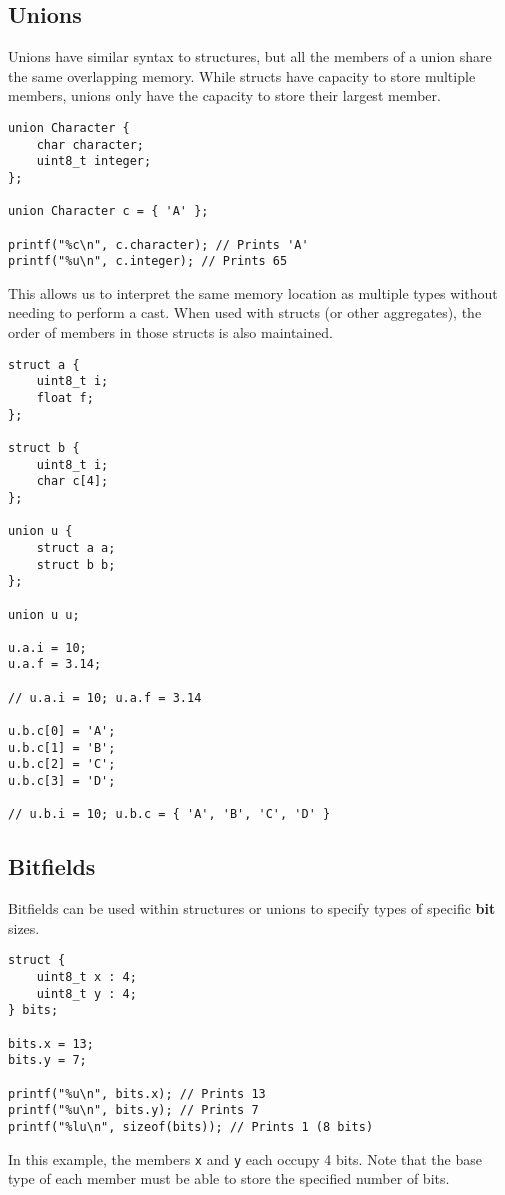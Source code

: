 \documentclass{article}
\begin{document}
\subsection{Unions}
Unions have similar syntax to structures, but all the members of a
union share the same overlapping memory. While structs have capacity to
store multiple members, unions only have the capacity to store their
largest member.
\begin{verbatim}
union Character {
    char character;
    uint8_t integer;
};

union Character c = { 'A' };

printf("%c\n", c.character); // Prints 'A'
printf("%u\n", c.integer); // Prints 65
\end{verbatim}
This allows us to interpret the same memory location as multiple types
without needing to perform a cast. When used with structs (or other
aggregates), the order of members in those structs is also maintained.
\begin{verbatim}
struct a {
    uint8_t i;
    float f;
};

struct b {
    uint8_t i;
    char c[4];
};

union u {
    struct a a;
    struct b b;
};

union u u;

u.a.i = 10;
u.a.f = 3.14;

// u.a.i = 10; u.a.f = 3.14

u.b.c[0] = 'A';
u.b.c[1] = 'B';
u.b.c[2] = 'C';
u.b.c[3] = 'D';

// u.b.i = 10; u.b.c = { 'A', 'B', 'C', 'D' }
\end{verbatim}
\subsection{Bitfields}
Bitfields can be used within structures or unions to specify types of
specific \textbf{bit} sizes.
\begin{verbatim}
struct {
    uint8_t x : 4;
    uint8_t y : 4;
} bits;

bits.x = 13;
bits.y = 7;

printf("%u\n", bits.x); // Prints 13
printf("%u\n", bits.y); // Prints 7
printf("%lu\n", sizeof(bits)); // Prints 1 (8 bits)
\end{verbatim}
In this example, the members \texttt{x} and \texttt{y}
each occupy 4 bits. Note that the base type of each member must be able
to store the specified number of bits.
\end{document}
